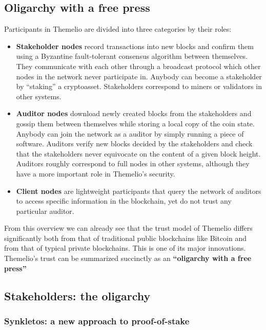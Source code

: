 \documentclass[headinclude,12pt]{scrbook}
\begin{document}
\subsection{Oligarchy with a free press}

Participants in Themelio are divided into three categories by their roles:

\begin{itemize}
    \item \textbf{Stakeholder nodes} record transactions into new blocks and confirm them using a Byzantine fault-tolerant consensus algorithm between themselves. They communicate with each other through a broadcast protocol which other nodes in the network never participate in. Anybody can become a stakeholder by ``staking'' a cryptoasset. Stakeholders correspond to miners or validators in other systems.
    \item \textbf{Auditor nodes} download newly created blocks from the stakeholders and gossip them between themselves while storing a local copy of the coin state. Anybody can join the network as a auditor by simply running a piece of software. Auditors verify new blocks decided by the stakeholders and check that the stakeholders never equivocate on the content of a given block height. Auditors roughly correspond to full nodes in other systems, although they have a more important role in Themelio's security.
    \item \textbf{Client nodes} are lightweight participants that query the network of auditors to access specific information in the blockchain, yet do not trust any particular auditor.
\end{itemize}

From this overview we can already see that the trust model of Themelio differs significantly both from that of traditional public blockchains like Bitcoin and from that of typical private blockchains. This is one of its major innovations. Themelio's trust can be summarized succinctly as an \textbf{``oligarchy with a free press''}

\subsection{Stakeholders: the oligarchy}

\subsubsection{Synkletos: a new approach to proof-of-stake}
\end{document}
